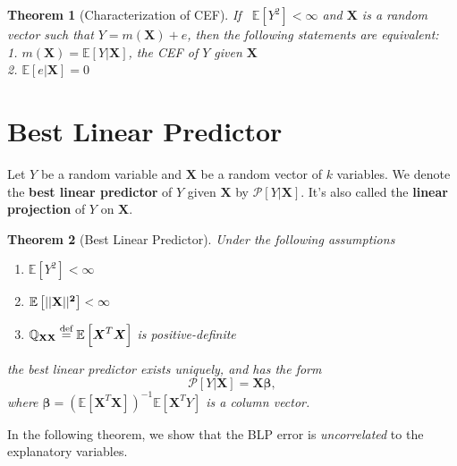 \documentclass[
]{book}
\providecommand{\tightlist}{%
  \setlength{\itemsep}{0pt}\setlength{\parskip}{0pt}}
\newtheorem{theorem}{Theorem}[chapter]
\theoremstyle{definition}
\theoremstyle{definition}
\theoremstyle{definition}
\theoremstyle{definition}
\theoremstyle{remark}
\begin{document}
\begin{theorem}[Characterization of CEF]
\protect\hypertarget{thm:cef}{}\label{thm:cef}If ~\({\mathbb{E}\left[ Y^2 \right]}<\infty\) and \({\boldsymbol{X}}\) is a random vector such that \(Y=m({\boldsymbol{X}})+e\), then the following statements are equivalent:\\
1. \(m({\boldsymbol{X}})={\mathbb{E}\left[ Y|{\boldsymbol{X}} \right]}\), the CEF of \(Y\) given \({\boldsymbol{X}}\)\\
2. \({\mathbb{E}\left[ e|{\boldsymbol{X}} \right]}=0\)
\end{theorem}

\hypertarget{best-linear-predictor}{%
\section{Best Linear Predictor}\label{best-linear-predictor}}

Let \(Y\) be a random variable and \({\boldsymbol{X}}\) be a random vector of \(k\) variables. We denote the \textbf{best linear predictor} of \(Y\) given \({\boldsymbol{X}}\) by \(\mathscr{P}[Y|{\boldsymbol{X}}]\). It's also called the \textbf{linear projection} of \(Y\) on \({\boldsymbol{X}}\).

\begin{theorem}[Best Linear Predictor]
\protect\hypertarget{thm:blp}{}\label{thm:blp}Under the following assumptions

\begin{enumerate}
\def\labelenumi{\arabic{enumi}.}
\tightlist
\item
  \({\mathbb{E}\left[ Y^2 \right]}<\infty\)
\item
  \({\mathbb{E}\left[ ||\bf{X}||^2 \right]}<\infty\)
\item
  \({\mathbb{Q}}_{\bf{XX}}\stackrel{\text{def}}{=}{\mathbb{E}\left[ {\boldsymbol{X}}^T{\boldsymbol{X}} \right]}\) is positive-definite
\end{enumerate}

the best linear predictor exists uniquely, and has the form
\[
\mathscr{P}[Y|{\boldsymbol{X}}]={\boldsymbol{X}}{\boldsymbol{\beta}},
\]
where \({\boldsymbol{\beta}}=\left({\mathbb{E}\left[ {\boldsymbol{X}}^T{\boldsymbol{X}} \right]}\right)^{-1}{\mathbb{E}}[{\boldsymbol{X}}^TY]\) is a column vector.
\end{theorem}

In the following theorem, we show that the BLP error is \emph{uncorrelated} to the explanatory variables.
\end{document}
